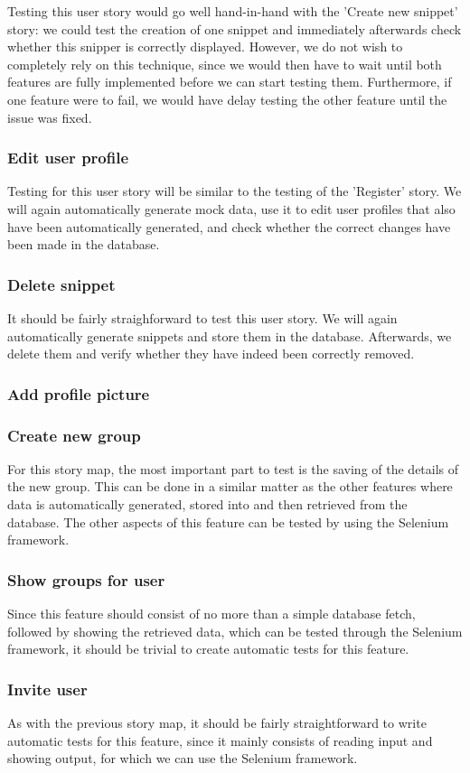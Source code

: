 \documentclass {article}
\begin{document}
Testing this user story would go well hand-in-hand with the 'Create new snippet'
story: we could test the creation of one snippet and immediately afterwards
check whether this snipper is correctly displayed.  However, we do not wish to
completely rely on this technique, since we would then have to wait until both
features are fully implemented before we can start testing them. Furthermore, if
one feature were to fail, we would have delay testing the other feature until
the issue was fixed.

\subsubsection*{Edit user profile}
Testing for this user story will be similar to the testing of the 'Register'
story. We will again automatically generate mock data, use it to edit user
profiles that also have been automatically generated, and check whether the
correct changes have been made in the database.

\subsubsection*{Delete snippet}
It should be fairly straighforward to test this user story. We will again
automatically generate snippets and store them in the database. Afterwards, we
delete them and verify whether they have indeed been correctly removed.

\subsubsection*{Add profile picture}

\subsubsection*{Create new group}
For this story map, the most important part to test is the saving of the details
of the new group. This can be done in a similar matter as the other features
where data is automatically generated, stored into and then retrieved from the
database.  The other aspects of this feature can be tested by using the Selenium
framework.

\subsubsection*{Show groups for user}
Since this feature should consist of no more than a simple database fetch,
followed by showing the retrieved data, which can be tested through the Selenium
framework, it should be trivial to create automatic tests for this feature.

\subsubsection*{Invite user}
As with the previous story map, it should be fairly straightforward to write
automatic tests for this feature, since it mainly consists of reading input and
showing output, for which we can use the Selenium framework.
\end{document}
